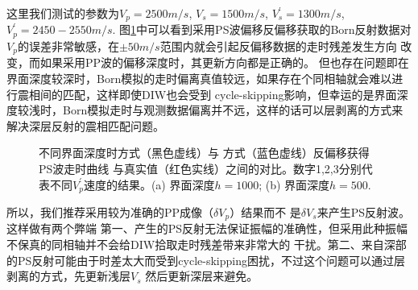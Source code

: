 这里我们测试的参数为$V_p=2500m/s$, $V_s=1500m/s$, $V^{'}_s=1300m/s$, $V^{'}_p=2450-2550m/s$.
图\ref{fig:Sens_vp}中可以看到采用PS波偏移反偏移获取的Born反射数据对$V_p$的误差非常敏感，在$\pm50m/s$范围内就会引起反偏移数据的走时残差发生方向
改变，而如果采用PP波的偏移深度时，其更新方向都是正确的。
但也存在问题即在界面深度较深时，Born模拟的走时偏离真值较远，如果存在个同相轴就会难以进行震相间的匹配，这样即使DIW也会受到
cycle-skipping影响，但幸运的是界面深度较浅时，Born模拟走时与观测数据偏离并不远，这样的话可以层剥离的方式来解决深层反射的震相匹配问题。
\begin{figure}[h]
   \centering
   \caption{不同界面深度时方式\uppercase\expandafter{}（黑色虚线）与
   方式\uppercase\expandafter{}（蓝色虚线）反偏移获得PS波走时曲线
   与真实值（红色实线）之间的对比。数字1,2,3分别代表不同$V^{'}_p$速度的结果。(a) 界面深度$h=1000$; (b) 界面深度$h=500$.}
   \label{fig:Sens_vp}
\end{figure}

所以，我们推荐采用较为准确的PP成像（$\delta V_p$）结果而不
是$\delta V_s$来产生PS反射波。这样做有两个弊端
第一、产生的PS反射无法保证振幅的准确性，但采用此种振幅不保真的同相轴并不会给DIW拾取走时残差带来非常大的
干扰。第二、来自深部的PS反射可能由于时差太大而受到cycle-skipping困扰，不过这个问题可以通过层剥离的方式，先更新浅层$V_s$
然后更新深层来避免。

